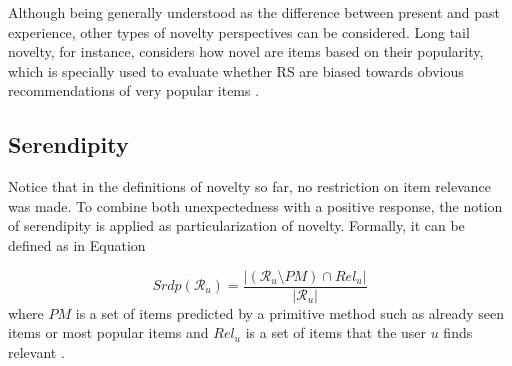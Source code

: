 Although being generally understood as the difference between present and past experience, other types of novelty perspectives can be considered. Long tail novelty, for instance, considers how novel are items based on their popularity, which is specially used to evaluate whether RS are biased towards obvious recommendations of very popular items \cite{2014NoveltyDiversityEnhancement}.

\subsection{Serendipity}

Notice that in the definitions of novelty so far, no restriction on item relevance was made. To combine both unexpectedness with a positive response, the notion of serendipity is applied as particularization of novelty. Formally, it can be defined as in Equation 

\begin{equation}
    \label{eq:serendipity}
    Srdp(\mathcal{R}_u) = \frac{|(\mathcal{R}_u \setminus PM) \cap Rel_u|}{|\mathcal{R}_u|}
\end{equation} where $PM$ is a set of items predicted by a primitive method such as already seen items or most popular items and $Rel_u$ is a set of items that the user $u$ finds relevant \cite{2014NoveltyDiversityEnhancement}.



